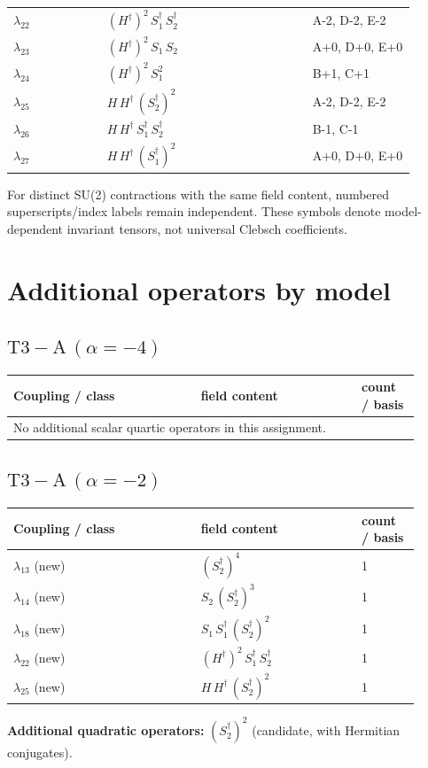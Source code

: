 \documentclass[9pt,a4paper]{article}
\begin{document}
\begin{longtable}{@{}p{0.21\linewidth}p{0.46\linewidth}p{0.23\linewidth}@{}}
$\lambda_{22}$ & $\left(H^\dagger\right)^{2}\, S_1^\dagger\, S_2^\dagger$ & A-2, D-2, E-2 \\
$\lambda_{23}$ & $\left(H^\dagger\right)^{2}\, S_1\, S_2$ & A+0, D+0, E+0 \\
$\lambda_{24}$ & $\left(H^\dagger\right)^{2}\, S_1^{2}$ & B+1, C+1 \\
$\lambda_{25}$ & $H\, H^\dagger\, \left(S_2^\dagger\right)^{2}$ & A-2, D-2, E-2 \\
$\lambda_{26}$ & $H\, H^\dagger\, S_1^\dagger\, S_2^\dagger$ & B-1, C-1 \\
$\lambda_{27}$ & $H\, H^\dagger\, \left(S_1^\dagger\right)^{2}$ & A+0, D+0, E+0 \\
\bottomrule
\end{longtable}
For distinct SU(2) contractions with the same field content, numbered superscripts/index labels remain independent. These symbols denote model-dependent invariant tensors, not universal Clebsch coefficients.
\section*{Additional operators by model}
\subsection*{$ \mathrm{T3-A}\,(\alpha=-4) $}
\begin{longtable}{@{}p{0.42\linewidth}p{0.36\linewidth}p{0.13\linewidth}@{}}
\toprule
Coupling / class & field content & count / basis\\
\midrule
\endhead
\multicolumn{3}{l}{No additional scalar quartic operators in this assignment.}\\
\bottomrule
\end{longtable}
\subsection*{$ \mathrm{T3-A}\,(\alpha=-2) $}
\begin{longtable}{@{}p{0.42\linewidth}p{0.36\linewidth}p{0.13\linewidth}@{}}
\toprule
Coupling / class & field content & count / basis\\
\midrule
\endhead
$\lambda_{13}$ (new) & $\left(S_2^\dagger\right)^{4}$ & 1 \\
$\lambda_{14}$ (new) & $S_2\, \left(S_2^\dagger\right)^{3}$ & 1 \\
$\lambda_{18}$ (new) & $S_1\, S_1^\dagger\, \left(S_2^\dagger\right)^{2}$ & 1 \\
$\lambda_{22}$ (new) & $\left(H^\dagger\right)^{2}\, S_1^\dagger\, S_2^\dagger$ & 1 \\
$\lambda_{25}$ (new) & $H\, H^\dagger\, \left(S_2^\dagger\right)^{2}$ & 1 \\
\bottomrule
\end{longtable}
\textbf{Additional quadratic operators:}
$\left(S_2^\dagger\right)^{2}$ (candidate, with Hermitian conjugates).
\end{document}
